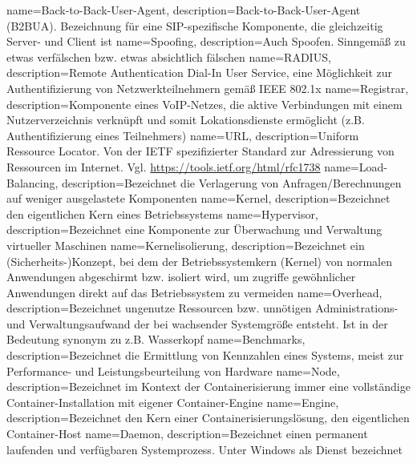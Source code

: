{
    name=Back-to-Back-User-Agent,
    description={Back-to-Back-User-Agent (B2BUA). Bezeichnung für eine \acrshort{SIP}-spezifische Komponente, die gleichzeitig Server- und Client ist}
}
{
    name=Spoofing,
    description={Auch Spoofen. Sinngemäß zu etwas verfälschen bzw. etwas absichtlich fälschen}
}
{
    name=RADIUS,
    description={Remote Authentication Dial-In User Service, eine Möglichkeit zur Authentifizierung von Netzwerkteilnehmern gemäß IEEE 802.1x}
}
{
    name=Registrar,
    description={Komponente eines \acrshort{VoIP}-Netzes, die aktive Verbindungen mit einem Nutzerverzeichnis verknüpft und somit Lokationsdienste ermöglicht (z.B. Authentifizierung eines Teilnehmers)}
}
{
    name=URL,
    description={Uniform Ressource Locator. Von der \gls{IETF} spezifizierter Standard zur Adressierung von Ressourcen im Internet. Vgl. \url{https://tools.ietf.org/html/rfc1738}}
}
{
    name=Load-Balancing,
    description={Bezeichnet die Verlagerung von Anfragen/Berechnungen auf weniger ausgelastete Komponenten}
}
{
    name=Kernel,
    description={Bezeichnet den eigentlichen Kern eines Betriebssystems}
}
{
    name=Hypervisor,
    description={Bezeichnet eine Komponente zur Überwachung und Verwaltung virtueller Maschinen}
}
{
    name=Kernelisolierung,
    description={Bezeichnet ein (Sicherheits-)Konzept, bei dem der Betriebssystemkern (Kernel) von normalen Anwendungen abgeschirmt bzw. isoliert wird, um zugriffe gewöhnlicher Anwendungen direkt auf das Betriebssystem zu vermeiden}
}
{
    name=Overhead,
    description={Bezeichnet ungenutze Ressourcen bzw. unnötigen Administrations- und Verwaltungsaufwand der bei wachsender Systemgröße entsteht. Ist in der Bedeutung synonym zu z.B. Wasserkopf}
}
{
    name=Benchmarks,
    description={Bezeichnet die Ermittlung von Kennzahlen eines Systems, meist zur Performance- und Leistungsbeurteilung von Hardware}
}
{
    name=Node,
    description={Bezeichnet im Kontext der Containerisierung immer eine vollständige Container-Installation mit eigener Container-Engine}
}
{
    name=Engine,
    description={Bezeichnet den Kern einer Containerisierungslösung, den eigentlichen Container-Host}
}
{
    name=Daemon,
    description={Bezeichnet einen permanent laufenden und verfügbaren Systemprozess. Unter Windows als Dienst bezeichnet}
}
